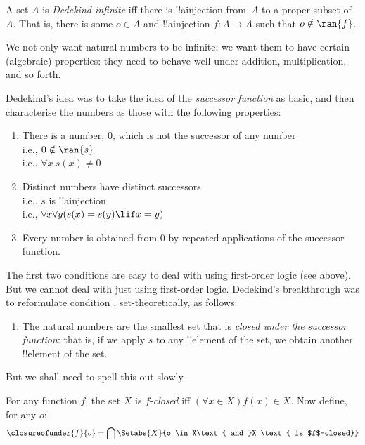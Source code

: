 \begin{defn}
A set $A$ is \emph{Dedekind infinite} iff there is !!a{injection}
from~$A$ to a proper subset of~$A$. That is, there is some $o \in A$
and !!a{injection} $f \colon A \to A$ such that $o \notin \ran{f}$.
\end{defn}





We not only want natural numbers to be infinite; we want them to have
certain (algebraic) properties: they need to behave well under
addition, multiplication, and so forth. 

Dedekind's idea was to take the idea of the \emph{successor function}
as basic, and then characterise the numbers as those with the
following properties:
\begin{enumerate}
	\item There is a number, $0$, which is not the successor of any number
	\\i.e., $0 \notin \ran{s}$
	\\i.e., $\forall x\ s(x) \neq 0$
	\item Distinct numbers have distinct successors 
	\\i.e., $s$ is !!a{injection}
	\\i.e., $\forall x \forall y (s(x) = s(y) \lif x = y)$
	\item{} Every number is obtained from
	$0$ by repeated applications of the successor function.
\end{enumerate}
The first two conditions are easy to deal with using first-order logic
(see above). But we cannot deal with  just
using first-order logic. Dedekind's breakthrough was to reformulate
condition , set-theoretically, as follows:
\begin{enumerate}
	\item[3$'$.] The natural numbers are the smallest set that is
	\emph{closed under the successor function}: that is, if we apply
	$s$ to any !!{element} of the set, we obtain another !!{element}
	of the set.
\end{enumerate}
But we shall need to spell this out slowly.

\begin{defn}
	For any function $f$, the set $X$ is $f$-\emph{closed} {iff}
	$(\forall x \in X)f(x) \in X$. Now define, for any $o$:
	$$\closureofunder{f}{o} = \bigcap\Setabs{X}{o \in X\text{ and }X
\text{ is $f$-closed}}$$
\end{defn}

